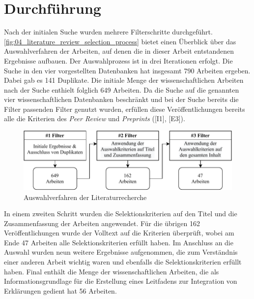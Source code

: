 \section{Durchführung}


Nach der initialen Suche wurden mehrere Filterschritte durchgeführt. \autoref{fig:04_literature_review_selection_process} bietet einen Überblick über das Auswahlverfahren der Arbeiten, auf denen die in dieser Arbeit entstandenen Ergebnisse aufbauen. Der Auswahlprozess ist in drei Iterationen erfolgt. Die Suche in den vier vorgestellten Datenbanken hat insgesamt 790 Arbeiten ergeben. Dabei gab es 141 Duplikate. Die initiale Menge der wissenschaftlichen Arbeiten nach der Suche enthielt folglich 649 Arbeiten. Da die Suche auf die genannten vier wissenschaftlichen Datenbanken beschränkt und bei der Suche bereits die Filter passenden Filter genutzt wurden, erfüllen diese Veröffentlichungen bereits alle die Kriterien des \textit{Peer Review} und \textit{Preprints} ([I1], [E3]).

\begin{figure}[htb]
    \centering
    \includegraphics[width=\textwidth]{contents/04_literature_review/res/selection_process.pdf}
    \caption{Auswahlverfahren der Literaturrecherche}
    \label{fig:04_literature_review_selection_process}
\end{figure}

In einem zweiten Schritt wurden die Selektionskriterien auf den Titel und die Zusammenfassung der Arbeiten angewendet. Für die übrigen 162 Veröffentlichungen wurde der Volltext auf die Kriterien überprüft, wobei am Ende 47 Arbeiten alle Selektionskriterien erfüllt haben. Im Anschluss an die Auswahl wurden neun weitere Ergebnisse aufgenommen, die zum Verständnis einer anderen Arbeit wichtig waren und ebenfalls die Selektionskriterien erfüllt haben. Final enthält die Menge der wissenschaftlichen Arbeiten, die als Informationsgrundlage für die Erstellung eines Leitfadens zur Integration von Erklärungen gedient hat 56 Arbeiten.